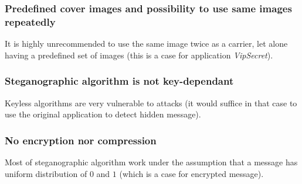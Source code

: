 \subsubsection{Predefined cover images and possibility to use same images repeatedly}
It is highly unrecommended to use the same image twice as a carrier, let alone having 
a predefined set of images (this is a case for application \emph{VipSecret}).

\subsubsection{Steganographic algorithm is not key-dependant}
Keyless algorithms are very vulnerable to attacks (it would suffice in that case
to use the original application to detect hidden message).

\subsubsection{No encryption nor compression}
Most of steganographic algorithm work under the assumption that a message has uniform distribution
of $0$ and $1$ (which is a case for encrypted message).
